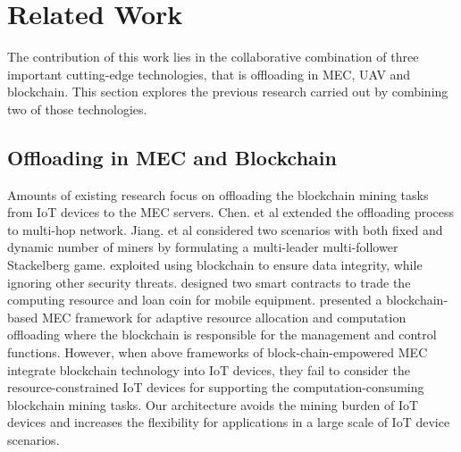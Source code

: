 \section{Related Work}\label{sec:related_work}
The contribution of this work lies in the collaborative combination of three important cutting-edge technologies, that is offloading in MEC, UAV and blockchain. 
This section explores the previous research carried out by combining two of those technologies.

\subsection{Offloading in MEC and Blockchain}
Amounts of existing research \cite{qiu2019online,chen2019cooperative,jiang2019hierarchical} focus on offloading the blockchain mining tasks from IoT devices to the MEC servers.
Chen. et al\cite{chen2019cooperative} extended the offloading process to multi-hop network. 
Jiang. et al\cite{jiang2019hierarchical} considered two scenarios with both fixed and dynamic number of miners by formulating a multi-leader multi-follower Stackelberg game.
\cite{xu2019become} exploited using blockchain to ensure data integrity, while ignoring other security threats.
\cite{zhang2019joint} designed two smart contracts to trade the computing resource and loan coin for mobile equipment.
\cite{guo2019adaptive} presented a blockchain-based MEC framework for adaptive resource allocation and computation offloading where the blockchain is responsible for the management and control functions.
However, when above frameworks of block-chain-empowered MEC integrate blockchain technology into IoT devices, they fail to consider the resource-constrained IoT devices for supporting the computation-consuming blockchain mining tasks.
Our architecture avoids the mining burden of IoT devices and increases the flexibility for applications in a large scale of IoT device scenarios.

